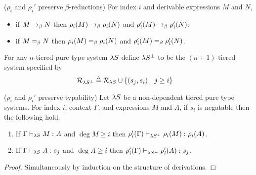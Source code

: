\documentclass{article}
\begin{document}
\begin{lemma}
\label{lem:rho-beta}
($\rho_i$ and $\rho_i'$ preserve $\beta$-reductions)
For index $i$ and derivable expressions $M$ and $N$,
\begin{itemize}
\item if $M \onestepbeta N$ then $\rho_i(M) \onestepbeta \rho_i(N)$ and $\rho_i'(M) \onestepbeta \rho_i'(N)$;
\item if $M \eqbeta N$ then $\rho_i(M) \eqbeta \rho_i(N)$ and $\rho_i'(M) \eqbeta \rho_i'(N)$.
\end{itemize}
\end{lemma}

\begin{definition}
For any $n$-tiered pure type system $\lS$ define $\lS^\bot$ to be the $(n + 1)$-tiered system specified by
\begin{align*}
  \rules_{\lS^\bot} &\df \rules_{\lS} \cup \setcomp {(s_j, s_i)} {j \geq i}
\end{align*}
\end{definition}

\begin{lemma}
\label{lem:rho-pres-type}
($\rho_i$ and $\rho_i'$ preserve typability) Let $\lS$ be a non-dependent tiered pure type systems.
For index $i$, context $\Gamma$, and expressions $M$ and $A$, if $s_i$ is negatable then the following hold.
\begin{enumerate}
\item\label{item:rho-preserves-types-i} If $\judgment[\lS] \Gamma M A$ and $\deg M \geq i$ then $\judgment[\lS^\bot] {\rho_i'(\Gamma)} {\rho_i(M)} {\rho_i(A)}$.
\item\label{item:rho-preserves-types-ii} If $\judgment[\lS] \Gamma A {s_j}$ and $\deg A \geq i$ then $\judgment[\lS^\bot]{\rho_i'(\Gamma)} {\rho_i'(A)} {s_j}$.
\end{enumerate}
\end{lemma}

\begin{proof}
Simultaneously by induction on the structure of derivations.







\end{proof}
\end{document}
